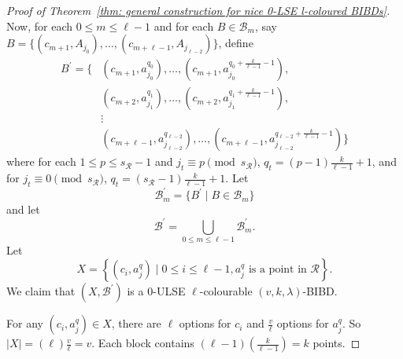 \documentclass[12pt]{article}
\theoremstyle{definition}
\begin{document}
\begin{proof}[Proof of Theorem~\ref{thm: general construction for nice 0-LSE l-coloured BIBDs}]
    Now, for each $0\leq m\leq \ell-1$ and for each $B\in \mathcal{B}_m$, say $B = \{(c_{m+1},A_{j_0}), \dots, (c_{m + \ell - 1},A_{j_{\ell -2}})\}$, define 
    \begin{align*}
        B^\prime = \Big\{ &(c_{m+1}, a_{j_0}^{q_0}), \dots, (c_{m+1},a_{j_0}^{q_0 + \frac{k}{\ell-1} - 1}),  \\
        &(c_{m+2}, a_{j_1}^{q_1}), \dots, (c_{m+2},a_{j_1}^{q_1 + \frac{k}{\ell-1} - 1}), \\
        &\vdots\\
        &(c_{m+\ell-1}, a_{j_{\ell-2}}^{q_{\ell-2}}), \dots, (c_{m+\ell-1},a_{j_{\ell-2}}^{q_{\ell-2} + \frac{k}{\ell-1} - 1})\Big\}
    \end{align*}
    where for each $1\leq p\leq s_{\mathcal{R}} - 1$ and $j_t \equiv p \pmod{s_{\mathcal{R}}}$, $q_t = (p-1)\frac{k}{\ell-1}+1$, and for $j_t \equiv 0 \pmod{s_{\mathcal{R}}}$, $q_t = \left( s_\mathcal{R} - 1 \right)\frac{k}{\ell-1} + 1$. Let \[\mathcal{B}^\prime_m = \{B^\prime \mid B\in \mathcal{B}_m\}\] and let \[\mathcal{B}^\prime = \bigcup_{0\leq m\leq \ell-1} \mathcal{B}^\prime_m.\] Let \[X = \left\{ (c_i,a_j^q) \mid 0\leq i\leq \ell-1, a_j^q \text{ is a point in } \mathcal{R} \right\}.\] We claim that $(X, \mathcal{B}^\prime)$ is a $0$-ULSE $\ell$-colourable $(v,k,\lambda)$-BIBD.

    For any $(c_i,a_j^q) \in X$, there are $\ell$ options for $c_i$ and $\frac{v}{\ell}$ options for $a_j^q$. So $|X| = (\ell)\frac{v}{\ell} = v$. Each block contains $(\ell-1)(\frac{k}{\ell-1}) = k$ points. 
    

\end{proof}
\end{document}
